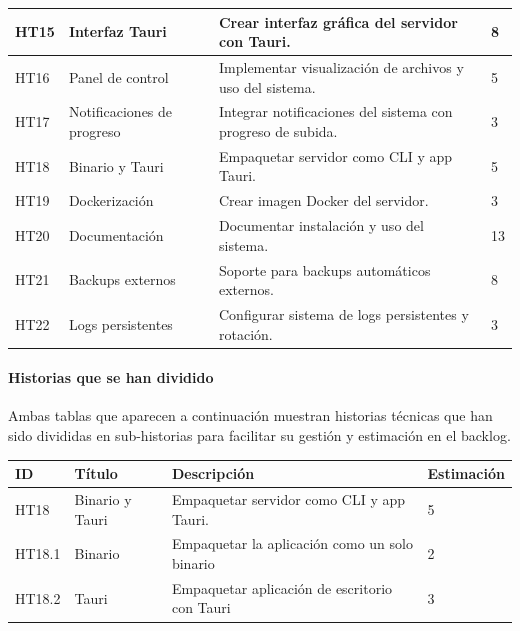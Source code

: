 \begin{tabularx}{\textwidth}{|l|l|>{\raggedright\arraybackslash}X|l|}
    HT15 & Interfaz Tauri & Crear interfaz gráfica del servidor con Tauri. & 8 \\
    \hline
    HT16 & Panel de control & Implementar visualización de archivos y uso del sistema. & 5 \\
    \hline
    HT17 & Notificaciones de progreso & Integrar notificaciones del sistema con progreso de subida. & 3 \\
    \hline
    HT18 & Binario y Tauri & Empaquetar servidor como CLI y app Tauri. & 5 \\
    \hline
    HT19 & Dockerización & Crear imagen Docker del servidor. & 3 \\
    \hline
    HT20 & Documentación & Documentar instalación y uso del sistema. & 13 \\
    \hline
    HT21 & Backups externos & Soporte para backups automáticos externos. & 8 \\
    \hline
    HT22 & Logs persistentes & Configurar sistema de logs persistentes y rotación. & 3 \\
    \hline
\end{tabularx}

\paragraph{Historias que se han dividido}

Ambas tablas que aparecen a continuación muestran historias técnicas que han sido divididas en sub-historias para facilitar su gestión y estimación en el backlog.

\begin{table}[h!]
    \begin{center}
        \begin{tabularx}{\textwidth}{|l|l|>{\raggedright}X|l|}
            \hline
            ID & Título & Descripción & Estimación \\
            \hline
            HT18 & Binario y Tauri & Empaquetar servidor como CLI y app Tauri. & 5 \\
            \hline
            HT18.1 & Binario & Empaquetar la aplicación como un solo binario & 2 \\
            \hline
            HT18.2 & Tauri & Empaquetar aplicación de escritorio con Tauri & 3 \\
            \hline
        \end{tabularx}
    \end{center}
\end{table}

